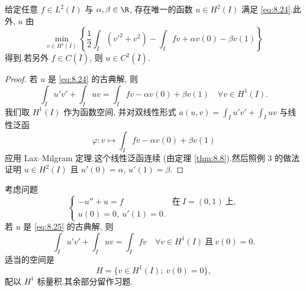 \begin{proposition}
\label{prop:8.18}
给定任意 $f\in L^2(I)$ 与 $\alpha,\beta\in\R$, 存在唯一的函数 $u\in H^2(I)$
满足 \eqref{eq:8.24}.此外, $u$ 由
\begin{equation*}
\min_{v\in H^1(I)}\left\{\frac12\int_I(v'^2+v^2)-\int_I fv+\alpha v(0)-\beta v(1)\right\}
\end{equation*}
得到.若另外 $f\in C(\bar I)$, 则 $u\in C^2(\bar I)$.
\end{proposition}

\begin{proof}
若 $u$ 是 \eqref{eq:8.24} 的古典解, 则
\begin{equation*}
\int_I u'v'+\int_I uv=\int_I fv-\alpha v(0)+\beta v(1)\quad\forall v\in H^1(I).
\end{equation*}
我们取 $H^1(I)$ 作为函数空间, 并对双线性形式
$a(u,v)=\int_I u'v'+\int_I uv$ 与线性泛函
\begin{equation*}
\varphi:v\mapsto\int_I fv-\alpha v(0)+\beta v(1)
\end{equation*}
应用 Lax--Milgram 定理.这个线性泛函连续 (由定理  \ref{thm:8.8}).然后照例 3
的做法证明 $u\in H^2(I)$ 且 $u'(0)=\alpha$, $u'(1)=\beta$.
\end{proof}

\begin{example}[混合边界条件]
\label{ex:8.5}
考虑问题
\begin{equation}
\begin{cases}
-u''+u=f & \text{在}\ I=(0,1)\ \text{上},\\
u(0)=0,\ u'(1)=0.
\end{cases}
\label{eq:8.25}
\end{equation}
若 $u$ 是 \eqref{eq:8.25} 的古典解, 则
\begin{equation}
\int_I u'v'+\int_I uv=\int_I fv\quad\forall v\in H^1(I)\ \text{且}\ v(0)=0.
\label{eq:8.26}
\end{equation}
适当的空间是
\begin{equation*}
H=\{v\in H^1(I);\ v(0)=0\},
\end{equation*}
配以 $H^1$ 标量积.其余部分留作习题.
\end{example}

